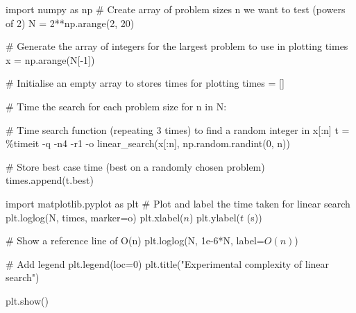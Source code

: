 \documentclass[
  letterpaper,
  DIV=11,
  numbers=noendperiod]{scrreprt}
\newenvironment{Shaded}{\begin{snugshade}}{\end{snugshade}}
\newcommand{\CommentTok}[1]{\textcolor[rgb]{0.37,0.37,0.37}{#1}}
\newcommand{\ControlFlowTok}[1]{\textcolor[rgb]{0.00,0.23,0.31}{#1}}
\newcommand{\DecValTok}[1]{\textcolor[rgb]{0.68,0.00,0.00}{#1}}
\newcommand{\FloatTok}[1]{\textcolor[rgb]{0.68,0.00,0.00}{#1}}
\newcommand{\ImportTok}[1]{\textcolor[rgb]{0.00,0.46,0.62}{#1}}
\newcommand{\KeywordTok}[1]{\textcolor[rgb]{0.00,0.23,0.31}{#1}}
\newcommand{\NormalTok}[1]{\textcolor[rgb]{0.00,0.23,0.31}{#1}}
\newcommand{\OperatorTok}[1]{\textcolor[rgb]{0.37,0.37,0.37}{#1}}
\newcommand{\StringTok}[1]{\textcolor[rgb]{0.13,0.47,0.30}{#1}}
\theoremstyle{definition}
\theoremstyle{remark}
\begin{document}
\begin{Shaded}
\begin{Highlighting}[]
\ImportTok{import}\NormalTok{ numpy }\ImportTok{as}\NormalTok{ np}
\CommentTok{\# Create array of problem sizes n we want to test (powers of 2)}
\NormalTok{N }\OperatorTok{=} \DecValTok{2}\OperatorTok{**}\NormalTok{np.arange(}\DecValTok{2}\NormalTok{, }\DecValTok{20}\NormalTok{)}

\CommentTok{\# Generate the array of integers for the largest problem to use in plotting times}
\NormalTok{x }\OperatorTok{=}\NormalTok{ np.arange(N[}\OperatorTok{{-}}\DecValTok{1}\NormalTok{])}

\CommentTok{\# Initialise an empty array to stores times for plotting}
\NormalTok{times }\OperatorTok{=}\NormalTok{ []}

\CommentTok{\# Time the search for each problem size}
\ControlFlowTok{for}\NormalTok{ n }\KeywordTok{in}\NormalTok{ N:}

    \CommentTok{\# Time search function (repeating 3 times) to find a random integer in x[:n]}
\NormalTok{    t }\OperatorTok{=} \OperatorTok{\%}\NormalTok{timeit }\OperatorTok{{-}}\NormalTok{q }\OperatorTok{{-}}\NormalTok{n4 }\OperatorTok{{-}}\NormalTok{r1 }\OperatorTok{{-}}\NormalTok{o linear\_search(x[:n], np.random.randint(}\DecValTok{0}\NormalTok{, n))}

    \CommentTok{\# Store best case time (best on a randomly chosen problem)}
\NormalTok{    times.append(t.best)}
\end{Highlighting}
\end{Shaded}

\begin{Shaded}
\begin{Highlighting}[]
\ImportTok{import}\NormalTok{ matplotlib.pyplot }\ImportTok{as}\NormalTok{ plt}
\CommentTok{\# Plot and label the time taken for linear search}
\NormalTok{plt.loglog(N, times, marker}\OperatorTok{=}\StringTok{\textquotesingle{}o\textquotesingle{}}\NormalTok{)}
\NormalTok{plt.xlabel(}\StringTok{\textquotesingle{}$n$\textquotesingle{}}\NormalTok{)}
\NormalTok{plt.ylabel(}\StringTok{\textquotesingle{}$t$ (s)\textquotesingle{}}\NormalTok{)}

\CommentTok{\# Show a reference line of O(n)}
\NormalTok{plt.loglog(N, }\FloatTok{1e{-}6}\OperatorTok{*}\NormalTok{N, label}\OperatorTok{=}\StringTok{\textquotesingle{}$O(n)$\textquotesingle{}}\NormalTok{)}

\CommentTok{\# Add legend}
\NormalTok{plt.legend(loc}\OperatorTok{=}\DecValTok{0}\NormalTok{)}
\NormalTok{plt.title(}\StringTok{"Experimental complexity of linear search"}\NormalTok{)}

\NormalTok{plt.show()}
\end{Highlighting}
\end{Shaded}
\end{document}
